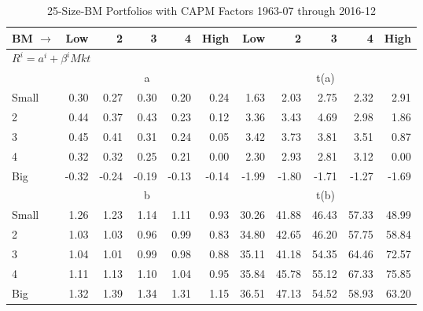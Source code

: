 
\begin{table}[!ht]
\centering
\caption{25-Size-BM Portfolios with CAPM Factors 1963-07 through 2016-12}
\begin{tabular}{lrrrrrrrrrr}
  \toprule
    BM $\rightarrow$ & Low & 2 & 3 & 4 & High & Low & 2 & 3 & 4 & High \\ 
  \midrule
  \multicolumn{11}{l}{$R^i=a^i+\beta^iMkt$} \\

  
    
      & \multicolumn{5}{c}{a} & \multicolumn{5}{c}{t(a)}
    
    \\
      \cmidrule(r){2-6} \cmidrule(r){7-11}

    Small   & 0.30  & 0.27  & 0.30  & 0.20  & 0.24  & 1.63  & 2.03  & 2.75  & 2.32  & 2.91  \\
         2  & 0.44  & 0.37  & 0.43  & 0.23  & 0.12  & 3.36  & 3.43  & 4.69  & 2.98  & 1.86  \\
         3  & 0.45  & 0.41  & 0.31  & 0.24  & 0.05  & 3.42  & 3.73  & 3.81  & 3.51  & 0.87  \\
         4  & 0.32  & 0.32  & 0.25  & 0.21  & 0.00  & 2.30  & 2.93  & 2.81  & 3.12  & 0.00  \\
    Big     & -0.32  & -0.24  & -0.19  & -0.13  & -0.14  & -1.99  & -1.80  & -1.71  & -1.27  & -1.69  \\

  
    
      & \multicolumn{5}{c}{b} & \multicolumn{5}{c}{t(b)}
    
    \\
      \cmidrule(r){2-6} \cmidrule(r){7-11}

    Small   & 1.26  & 1.23  & 1.14  & 1.11  & 0.93  & 30.26  & 41.88  & 46.43  & 57.33  & 48.99  \\
         2  & 1.03  & 1.03  & 0.96  & 0.99  & 0.83  & 34.80  & 42.65  & 46.20  & 57.75  & 58.84  \\
         3  & 1.04  & 1.01  & 0.99  & 0.98  & 0.88  & 35.11  & 41.18  & 54.35  & 64.46  & 72.57  \\
         4  & 1.11  & 1.13  & 1.10  & 1.04  & 0.95  & 35.84  & 45.78  & 55.12  & 67.33  & 75.85  \\
    Big     & 1.32  & 1.39  & 1.34  & 1.31  & 1.15  & 36.51  & 47.13  & 54.52  & 58.93  & 63.20  \\

  

  \bottomrule
\end{tabular}
\label{tbl:25_Size_BM_CAPM}
\end{table}